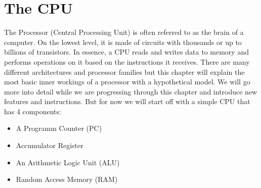 \section{The CPU}

The Processor (Central Processing Unit) is often referred to as the brain of a computer. On the
lowest level, it is made of circuits with thousands or up to billions of transistors. In
essence, a CPU reads and writes data to memory and performs operations on it based on the
instructions it receives. There are many different architectures and processor families but
this chapter will explain the most basic inner workings of a processor with a hypothetical
model. We will go more into detail while we are progressing through this chapter and introduce new 
features and instructions. But for now we will start off with a simple CPU that has 4 components:

\begin{itemize}
	\item A Programm Counter (PC)
	\item Accumulator Register
	\item An Arithmetic Logic Unit (ALU)
	\item Random Access Memory (RAM)
\end{itemize}


